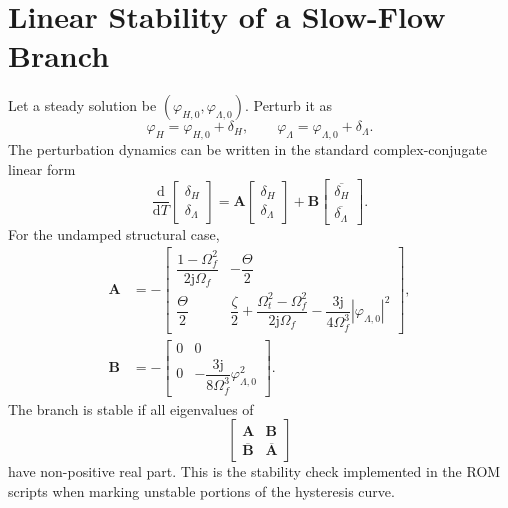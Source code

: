 \documentclass[11pt]{article}
\newcommand{\dd}{\mathrm{d}}
\newcommand{\jj}{\mathrm{j}}
\begin{document}
\section{Linear Stability of a Slow-Flow Branch}

Let a steady solution be
$(\varphi_{H,0},\varphi_{\Lambda,0})$.  Perturb it as
\begin{equation}
  \varphi_H=\varphi_{H,0}+\delta_H,\qquad
  \varphi_\Lambda=\varphi_{\Lambda,0}+\delta_\Lambda.
\end{equation}
The perturbation dynamics can be written in the standard complex-conjugate
linear form
\begin{equation}
  \frac{\dd}{\dd T}
  \begin{bmatrix}
    \delta_H\\
    \delta_\Lambda
  \end{bmatrix}
  =
  \bm A
  \begin{bmatrix}
    \delta_H\\
    \delta_\Lambda
  \end{bmatrix}
  +
  \bm B
  \begin{bmatrix}
    \overline{\delta_H}\\
    \overline{\delta_\Lambda}
  \end{bmatrix}.
\end{equation}
For the undamped structural case,
\begin{align}
  \bm A
  &=
  -\begin{bmatrix}
  \dfrac{1-\Omega_f^2}{2\jj\Omega_f}
  &
  -\dfrac{\Theta}{2}\\[6pt]
  \dfrac{\Theta}{2}
  &
  \dfrac{\zeta}{2}
  +\dfrac{\Omega_t^2-\Omega_f^2}{2\jj\Omega_f}
  -\dfrac{3\jj}{4\Omega_f^3}
  |\varphi_{\Lambda,0}|^2
  \end{bmatrix},\\
  \bm B
  &=
  -\begin{bmatrix}
  0&0\\
  0&-\dfrac{3\jj}{8\Omega_f^3}\varphi_{\Lambda,0}^2
  \end{bmatrix}.
\end{align}
The branch is stable if all eigenvalues of
\begin{equation}
  \begin{bmatrix}
    \bm A & \bm B\\
    \overline{\bm B} & \overline{\bm A}
  \end{bmatrix}
\end{equation}
have non-positive real part.  This is the stability check implemented in the
ROM scripts when marking unstable portions of the hysteresis curve.
\end{document}
